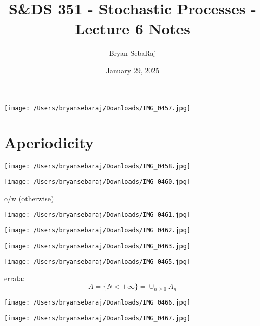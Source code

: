\documentclass{article}
\title{S\&DS 351 - Stochastic Processes - Lecture 6 Notes}
\author{Bryan SebaRaj}
\date{January 29, 2025}
\begin{document}
\maketitle


\texttt{[image: /Users/bryansebaraj/Downloads/IMG\_0457.jpg]}

\section*{Aperiodicity}

\texttt{[image: /Users/bryansebaraj/Downloads/IMG\_0458.jpg]}


\texttt{[image: /Users/bryansebaraj/Downloads/IMG\_0460.jpg]}

o/w (otherwise)

\texttt{[image: /Users/bryansebaraj/Downloads/IMG\_0461.jpg]}


\texttt{[image: /Users/bryansebaraj/Downloads/IMG\_0462.jpg]}


\texttt{[image: /Users/bryansebaraj/Downloads/IMG\_0463.jpg]}

\texttt{[image: /Users/bryansebaraj/Downloads/IMG\_0465.jpg]}

errata: $$A=\{N < +\infty\}=\cup_{n\geq 0}A_n$$


\texttt{[image: /Users/bryansebaraj/Downloads/IMG\_0466.jpg]}

\texttt{[image: /Users/bryansebaraj/Downloads/IMG\_0467.jpg]}

\end{document}
